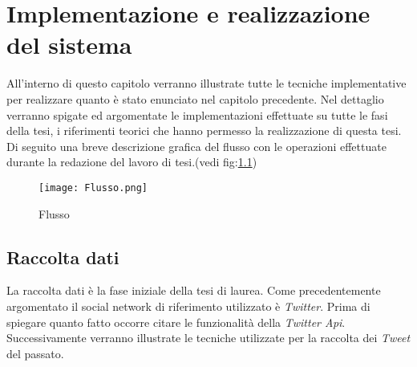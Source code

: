 \chapter{Implementazione e realizzazione del sistema}
\label{capitolo5}
\thispagestyle{empty}



\noindent All'interno di questo capitolo verranno illustrate tutte le tecniche implementative per realizzare quanto è stato enunciato nel capitolo precedente. Nel dettaglio verranno spigate ed argomentate le implementazioni effettuate su tutte le fasi della tesi, i riferimenti teorici che hanno permesso la realizzazione di questa tesi. Di seguito una breve descrizione grafica del flusso con le operazioni effettuate durante la redazione del lavoro di tesi.(vedi fig:\ref{Flusso})
\begin{figure}[h!]
    \begin{center}
      \texttt{[image: Flusso.png]}
	\caption{Flusso}
	\label{Flusso}
    \end{center}
  \end{figure}

\section{Raccolta dati}
\label{raccolta}
La raccolta dati è la fase iniziale della tesi di laurea. Come precedentemente argomentato il social network di riferimento utilizzato è \textit{Twitter}. Prima di spiegare quanto fatto occorre citare le funzionalità della \textit{Twitter Api}. Successivamente verranno illustrate le tecniche utilizzate per la raccolta dei \textit{Tweet} del passato.
